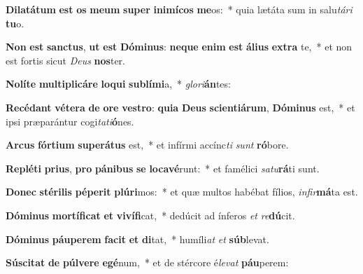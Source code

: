 \item \textbf{Di}\textbf{la}\textbf{tá}\textbf{tum} \textbf{est} \textbf{os} \textbf{me}\textbf{um} \textbf{su}\textbf{per} \textbf{in}\textbf{i}\textbf{mí}\textbf{cos} \textbf{me}os:~* quia lætáta sum in salu\textit{tá}\textit{ri} \textbf{tu}o.
\item \textbf{Non} \textbf{est} \textbf{sanc}\textbf{tus}, \textbf{ut} \textbf{est} \textbf{Dó}\textbf{mi}\textbf{nus}: \textbf{ne}\textbf{que} \textbf{e}\textbf{nim} \textbf{est} \textbf{á}\textbf{li}\textbf{us} \textbf{ex}\textbf{tra} te,~* et non est fortis sicut \textit{De}\textit{us} \textbf{nos}ter.
\item \textbf{No}\textbf{lí}\textbf{te} \textbf{mul}\textbf{ti}\textbf{pli}\textbf{cá}\textbf{re} \textbf{lo}\textbf{qui} \textbf{sub}\textbf{lí}\textbf{mi}a,~* \textit{glo}\textit{ri}\textbf{án}tes:
\item \textbf{Re}\textbf{cé}\textbf{dant} \textbf{vé}\textbf{te}\textbf{ra} \textbf{de} \textbf{o}\textbf{re} \textbf{ves}\textbf{tro}: \textbf{qui}\textbf{a} \textbf{De}\textbf{us} \textbf{sci}\textbf{en}\textbf{ti}\textbf{á}\textbf{rum}, \textbf{Dó}\textbf{mi}\textbf{nus} est,~* et ipsi præparántur cogi\textit{ta}\textit{ti}\textbf{ó}nes.
\item \textbf{Ar}\textbf{cus} \textbf{fór}\textbf{ti}\textbf{um} \textbf{su}\textbf{pe}\textbf{rá}\textbf{tus} est,~* et infírmi accínc\textit{ti} \textit{sunt} \textbf{ró}bore.
\item \textbf{Re}\textbf{plé}\textbf{ti} \textbf{pri}\textbf{us}, \textbf{pro} \textbf{pá}\textbf{ni}\textbf{bus} \textbf{se} \textbf{lo}\textbf{ca}\textbf{vé}runt:~* et famélici \textit{sa}\textit{tu}\textbf{rá}ti sunt.
\item \textbf{Do}\textbf{nec} \textbf{sté}\textbf{ri}\textbf{lis} \textbf{pé}\textbf{pe}\textbf{rit} \textbf{plú}\textbf{ri}mos:~* et quæ multos habébat fílios, \textit{in}\textit{fir}\textbf{má}ta est.
\item \textbf{Dó}\textbf{mi}\textbf{nus} \textbf{mor}\textbf{tí}\textbf{fi}\textbf{cat} \textbf{et} \textbf{vi}\textbf{ví}\textbf{fi}cat,~* dedúcit ad ínferos \textit{et} \textit{re}\textbf{dú}cit.
\item \textbf{Dó}\textbf{mi}\textbf{nus} \textbf{páu}\textbf{pe}\textbf{rem} \textbf{fa}\textbf{cit} \textbf{et} \textbf{di}tat,~* humíli\textit{at} \textit{et} \textbf{súb}levat.
\item \textbf{Sú}\textbf{sci}\textbf{tat} \textbf{de} \textbf{púl}\textbf{ve}\textbf{re} \textbf{e}\textbf{gé}num,~* et de stércore é\textit{le}\textit{vat} \textbf{páu}perem:
